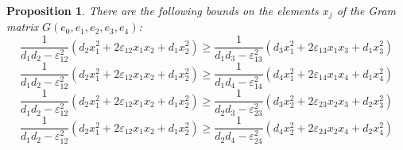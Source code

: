 \documentclass[14pt]{article}
\newtheorem{proposition}{\indent Proposition}[section]
\begin{document}
\begin{proposition}\label{oz-rasst-zel-matr-gr}
There are the following bounds on
the elements $x_j$ of the Gram matrix $G(e_0, e_1, e_2, e_3, e_4)$:
\begin{equation}\label{ur-1}
\dfrac{1}{d_1 d_2 - \varepsilon_{12}^2} (d_2 x_1^2
+ 2 \varepsilon_{12} x_1 x_2 + d_1 x_2^2)
\ge \dfrac{1}{d_1 d_3 - \varepsilon_{13}^2}  (d_3 x_1^2 +
2 \varepsilon_{13} x_1 x_3 + d_1 x_3^2)
\end{equation}
\begin{equation}\label{ur-2}
\dfrac{1}{d_1 d_2 - \varepsilon_{12}^2}(d_2 x_1^2
+ 2 \varepsilon_{12} x_1 x_2 + d_1 x_2^2)
 \ge \dfrac{1}{d_1 d_4 - \varepsilon_{14}^2}  (d_4 x_1^2 + 2
\varepsilon_{14} x_1 x_4 + d_1 x_4^2)
\end{equation}
\begin{equation}\label{ur-3}
\dfrac{1}{d_1 d_2 - \varepsilon_{12}^2}(d_2 x_1^2
+ 2 \varepsilon_{12} x_1 x_2 + d_1 x_2^2)
\ge  \dfrac{1}{d_2 d_3 - \varepsilon_{23}^2}  (d_3 x_2^2 + 2
\varepsilon_{23} x_2 x_3 + d_2 x_3^2)
\end{equation}
\begin{equation}\label{ur-4}
\dfrac{1}{d_1 d_2 - \varepsilon_{12}^2}(d_2 x_1^2
+ 2 \varepsilon_{12} x_1 x_2 + d_1 x_2^2)
 \ge \dfrac{1}{d_2 d_4 - \varepsilon_{24}^2}  (d_4 x_2^2 + 2
\varepsilon_{24} x_2 x_4 +  d_2 x_4^2)
\end{equation}
\end{proposition}
\end{document}
